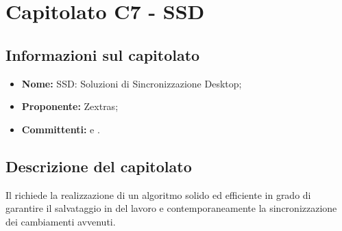 \section{Capitolato C7 - SSD}\label{C7}
\subsection{Informazioni sul capitolato}
\begin{itemize}
	\item \textbf{Nome:} SSD: Soluzioni di Sincronizzazione Desktop;
	\item \textbf{Proponente:} Zextras;
	\item \textbf{Committenti:} \VT{} e \CR{}.
\end{itemize}

\subsection{Descrizione del capitolato}
Il  richiede la realizzazione di un algoritmo solido ed efficiente in grado di garantire il salvataggio in  del lavoro e contemporaneamente la sincronizzazione dei cambiamenti avvenuti.


